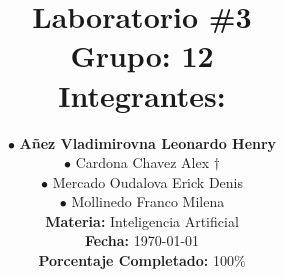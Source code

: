 
\newcommand{\NumeroLaboratorio}{3}		%
\newcommand{\PorcentajeCompletado}{100}	%





\title{
\hspace{-0.1cm}\LARGE{Laboratorio \#\NumeroLaboratorio} \\\vspace{0.05cm}
{\large Grupo: 12} \\\vspace{0.2cm}
{\large Integrantes:} \\\vspace{0.2cm}
}

\author{
\hspace{0.5cm}$\bullet$ \textbf{Añez Vladimirovna Leonardo Henry}\\
\hspace{0.5cm}$\bullet$ Cardona Chavez Alex  $\dagger$ \\
\hspace{0.5cm}$\bullet$ Mercado Oudalova Erick Denis \\
\hspace{0.5cm}$\bullet$ Mollinedo Franco Milena\\\vspace{0.2cm}
\textbf{Materia:} Inteligencia Artificial \\\vspace{0.2cm}
\textbf{Fecha:} \today \\\vspace{0.2cm}
\textbf{Porcentaje Completado:} \PorcentajeCompletado$\%$
}
\maketitle